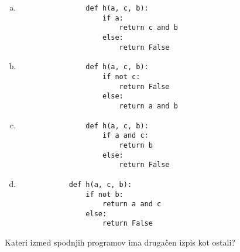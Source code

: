 \documentclass[arhiv, 10pt]{../izpit}
\begin{document}
        \begin{multicols}{2}
        \begin{enumerate}[(a)]
\item 
                \begin{verbatim}
                def h(a, c, b):
                    if a:
                        return c and b
                    else:
                        return False
                \end{verbatim}
            
\item 
                \begin{verbatim}
                def h(a, c, b):
                    if not c:
                        return False
                    else:
                        return a and b
                \end{verbatim}
            
\item 
                \begin{verbatim}
                def h(a, c, b):
                    if a and c:
                        return b
                    else:
                        return False
                \end{verbatim}
            
\item 
            \begin{verbatim}
            def h(a, c, b):
                if not b:
                    return a and c
                else:
                    return False
            \end{verbatim}
        
\end{enumerate}

        \end{multicols}
    
        \naloga*
        
        Kateri izmed spodnjih programov ima drugačen izpis kot ostali?
    
\end{document}
